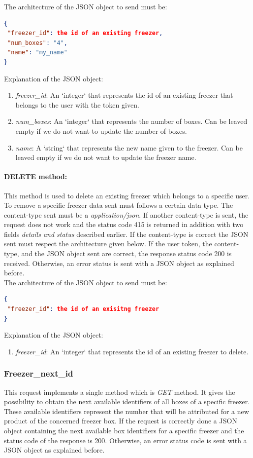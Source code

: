 The architecture of the JSON object to send must be:
\begin{lstlisting}[language=json]
{
 "freezer_id": the id of an existing freezer,
 "num_boxes": "4",
 "name": "my_name"
}
\end{lstlisting}

Explanation of the  JSON object:
\begin{enumerate}
\item \textit{freezer\_id}: An `integer` that represents the id of an existing freezer that belongs to the user with the token given.
\item \textit{num\_boxes}: An `integer` that represents the number of boxes. Can be leaved empty if we do not want to update the number of boxes.
\item \textit{name}: A `string` that represents the new name given to the freezer. Can be leaved empty if we do not want to update the freezer name.
\end{enumerate}

\paragraph{DELETE method:} This method is used to delete an existing freezer which belongs to a specific user. To remove a specific freezer data sent must follows a certain data type.  The content-type sent must be a \textit{application/json}. If another content-type is sent, the request does not work and the status code 415 is returned in addition with two fields \textit{details and status} described earlier. If the content-type is correct the JSON sent must respect the architecture given below. If the user token, the content-type, and the JSON object sent are correct, the response status code 200 is received. Otherwise, an error status is sent with a JSON object as explained before.\\

The architecture of the JSON object to send must be:
\begin{lstlisting}[language=json]
{
 "freezer_id": the id of an exisitng freezer
}
\end{lstlisting}

Explanation of the  JSON object:
\begin{enumerate}
\item \textit{freezer\_id}: An `integer` that represents the id of an existing freezer to delete.
\end{enumerate}

\subsubsection{Freezer\_next\_id}
This request implements a single method which is \textit{GET} method. It gives the possibility to obtain the next available identifiers of all boxes of a specific freezer. These available identifiers represent the number that will be attributed for a new product of the concerned freezer box. If the request is correctly done a JSON object containing the next available box identifiers for a specific freezer and the status code of the response is 200. Otherwise, an error status code is sent with a JSON object as explained before.\\


